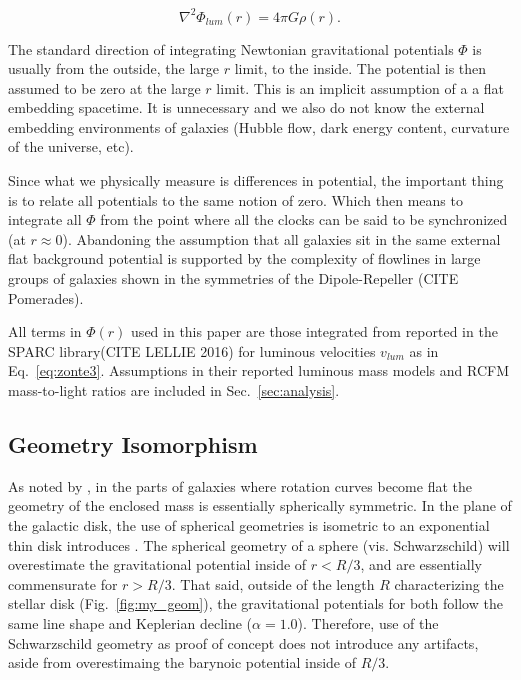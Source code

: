 \documentclass[reprint,%
 amsmath,amssymb,
 aps,
]{revtex4-1}
\begin{document}
\begin{equation}
\nabla^2 \Phi_{lum} (r) = 4\pi G \rho (r).   
    \label{whatsgood}
\end{equation}




  The standard direction of integrating Newtonian gravitational potentials $\Phi$  is usually from the outside, the large $r$ limit, to the inside. The potential is then  assumed to be   zero at the large $r$ limit. This is an implicit assumption of a 
  a flat  embedding spacetime.  It is unnecessary and we also do not know the external embedding environments of galaxies (Hubble flow, dark energy content, curvature of the universe, etc). 
  
Since what  we physically measure is differences in potential, the important thing is to relate all potentials to the same notion of zero. 
Which then means to integrate all 
   $\Phi$ from the  point  where all the clocks can be said to be synchronized (at $r\approx 0$).
   Abandoning the assumption that all galaxies sit in the same external flat background potential is supported by the complexity  of flowlines in large groups of galaxies shown in the  symmetries of
the Dipole-Repeller (CITE Pomerades). 
   
   
   All terms in $\Phi(r)$ used in this paper  are those  integrated from reported in the      SPARC  library(CITE LELLIE 2016) for  luminous velocities $v_{lum}$ as in Eq.~\ref{eq:zonte3}.  Assumptions in their reported luminous mass models and RCFM mass-to-light ratios are included in Sec.~\ref{sec:analysis}. 
 
 

 
  
    


\subsection{Geometry Isomorphism}
As noted by \citet{PhysRevD.70.083509}, in the parts of galaxies where rotation curves become flat the geometry of the enclosed mass is essentially spherically symmetric. 
In the plane of the galactic disk, the use of spherical geometries is isometric to an  exponential thin disk introduces  \citet{Chatterjee}. The spherical geometry of a sphere (vis. Schwarzschild) will overestimate the gravitational potential inside of $r< R/3$, and are essentially commensurate   for $r>R/3$. That said, outside of the length $R$ characterizing the stellar disk (Fig.~\ref{fig:my_geom}),  the   gravitational potentials for both follow the same line shape and Keplerian decline  ($\alpha = 1.0$). Therefore, use of the Schwarzschild geometry as proof of concept does not introduce any artifacts, aside from overestimaing the barynoic potential inside of $R/3$. 
 
\end{document}

